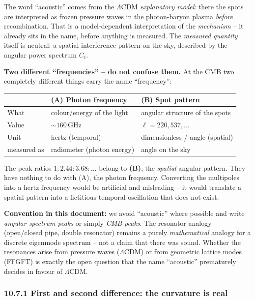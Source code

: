 The word ``acoustic'' comes from the $\Lambda$CDM \emph{explanatory
model}: there the spots are interpreted as frozen pressure waves in
the photon-baryon plasma \emph{before} recombination. That is a
model-dependent interpretation of the \emph{mechanism} -- it already
sits in the name, before anything is measured. The \emph{measured
quantity} itself is neutral: a spatial interference pattern on the
sky, described by the angular power spectrum $C_\ell$.

\textbf{Two different ``frequencies'' -- do not confuse them.} At the
CMB two completely different things carry the name ``frequency'':

\begin{center}
\begin{tabular}{p{1cm}p{5.3cm}p{5.3cm}}
\toprule
 & \textbf{(A) Photon frequency} & \textbf{(B) Spot pattern} \\
\midrule
What & colour/energy of the light & angular structure of the spots \\
Value & $\sim 160$\,GHz & $\ell = 220, 537, \ldots$ \\
Unit & hertz (temporal) & dimensionless / angle (spatial) \\
measured as & radiometer (photon energy) & angle on the sky \\
\bottomrule
\end{tabular}
\end{center}

The peak ratios $1:2{.}44:3{.}68:\ldots$ belong to \textbf{(B)},
the \emph{spatial} angular pattern. They have nothing to do with (A),
the photon frequency. Converting the multipoles into a hertz frequency
would be artificial and misleading -- it would translate a spatial
pattern into a fictitious temporal oscillation that does not exist.

\textbf{Convention in this document:} we avoid ``acoustic'' where
possible and write \emph{angular-spectrum peaks} or simply
\emph{CMB peaks}. The resonator analogy (open/closed pipe, double
resonator) remains a purely \emph{mathematical} analogy for a discrete
eigenmode spectrum -- not a claim that there was sound. Whether the
resonances arise from pressure waves ($\Lambda$CDM) or from geometric
lattice modes (FFGFT) is exactly the open question that the name
``acoustic'' prematurely decides in favour of $\Lambda$CDM.

\subsubsection*{10.7.1 First and second difference: the curvature is real}

